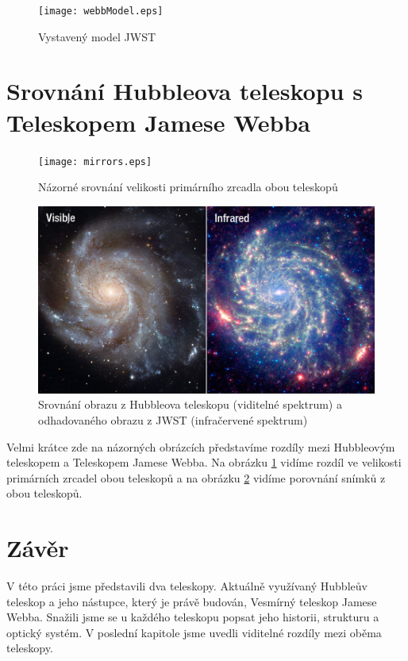\documentclass[a4paper,11pt]{article}
\begin{document}
\begin{figure}[h]
\begin{center}
\texttt{[image: webbModel.eps]}
\caption{Vystavený model JWST}
\end{center}
\end{figure}
\newpage


\newpage
\section{Srovnání Hubbleova teleskopu s Teleskopem Jamese Webba}

\begin{figure}[h!]
\begin{center}
\texttt{[image: mirrors.eps]}
\caption{Názorné srovnání velikosti primárního zrcadla obou teleskopů}
\label{mirrors}
\end{center}
\end{figure}

\begin{figure}[h!]
\begin{center}
\includegraphics[width=16cm]{compare.jpg}
\caption{Srovnání obrazu z Hubbleova teleskopu (viditelné spektrum) a odhadovaného obrazu z JWST (infračervené spektrum)}
\label{compare}
\end{center}
\end{figure}

Velmi krátce zde na názorných obrázcích představíme rozdíly mezi Hubbleovým teleskopem a Teleskopem Jamese Webba. Na obrázku \ref{mirrors} vidíme rozdíl ve velikosti primárních zrcadel obou teleskopů a na obrázku \ref{compare} vidíme porovnání snímků z obou teleskopů.

\newpage
\section{Závěr}
V této práci jsme představili dva teleskopy. Aktuálně využívaný Hubbleův teleskop a jeho nástupce, který je právě budován, Vesmírný teleskop Jamese Webba. Snažili jsme se u každého teleskopu popsat jeho historii, strukturu a optický systém. V poslední kapitole jsme uvedli viditelné rozdíly mezi oběma teleskopy.
\newpage



\def\refname{Použitá literatura}

\end{document}
